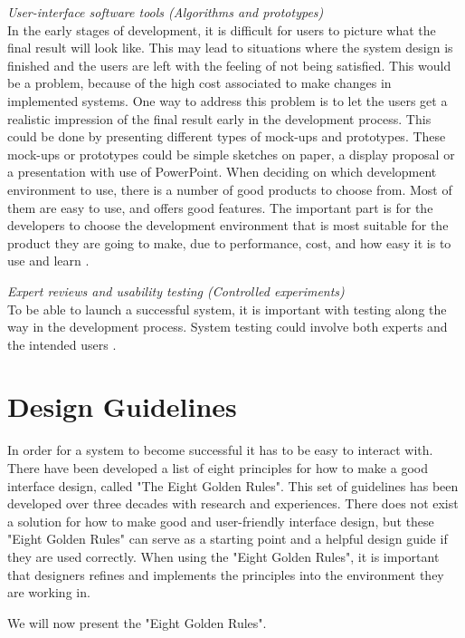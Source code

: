 \emph{User-interface software tools (Algorithms and prototypes)}\\
In the early stages of development, it is difficult for users to picture what the final result will look like. This may lead to situations where the system design is finished and the users are left with the feeling of not being satisfied. This would be a problem, because of the high cost associated to make changes in implemented systems. One way to address this problem is to let the users get a realistic impression of the final result early in the development process. This could be done by presenting different types of mock-ups and prototypes. These mock-ups or prototypes could be simple sketches on paper, a display proposal or a presentation with use of PowerPoint. When deciding on which development environment to use, there is a number of good products to choose from. Most of them are easy to use, and offers good features. The important part is for the developers to choose the development environment that is most suitable for the product they are going to make, due to performance, cost, and how easy it is to use and learn \cite{mmi}.
	
\emph{Expert reviews and usability testing (Controlled experiments)}\\
To be able to launch a successful system, it is important with testing along the way in the development process. System testing could involve both experts and the intended users \cite{mmi}. 

\section{Design Guidelines}
\label{sec:designguide}
In order for a system to become successful it has to be easy to interact with. There have been developed a list of eight principles for how to make a good interface design, called "The Eight Golden Rules". This set of guidelines has been developed over three decades with research and experiences. There does not exist a solution for how to make good and user-friendly interface design, but these "Eight Golden Rules" can serve as a starting point and a helpful design guide if they are used correctly. When using the "Eight Golden Rules", it is important that designers refines and implements the principles into the environment they are working in. 

We will now present the "Eight Golden Rules".

